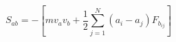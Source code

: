 \documentclass[12pt]{article}
\begin{document}
$$
   S_{ab} = - \left[ m v_a v_b + 
     \frac{1}{2} \sum_{j = 1}^N (a_i - a_j) F_{b_{ij}} \right]
$$
\end{document}
